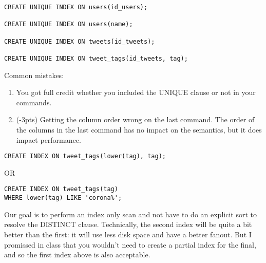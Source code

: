 \documentclass[12pt]{exam}
\theoremstyle{definition}
\begin{document}
\begin{questions}

\begin{solution}
\begin{lstlisting}
CREATE UNIQUE INDEX ON users(id_users);

CREATE UNIQUE INDEX ON users(name);

CREATE UNIQUE INDEX ON tweets(id_tweets);

CREATE UNIQUE INDEX ON tweet_tags(id_tweets, tag);
\end{lstlisting}

Common mistakes:

\begin{enumerate}
    \item You got full credit whether you included the UNIQUE clause or not in your commands.
    \item (-3pts)
        Getting the column order wrong on the last command.
        The order of the columns in the last command has no impact on the semantics, but it does impact performance.  
\end{enumerate}
\end{solution}

\newpage
{}

\begin{solution}
\begin{lstlisting}
CREATE INDEX ON tweet_tags(lower(tag), tag);
\end{lstlisting}
OR
\begin{lstlisting}
CREATE INDEX ON tweet_tags(tag)
WHERE lower(tag) LIKE 'corona%';
\end{lstlisting}

Our goal is to perform an index only scan and not have to do an explicit sort to resolve the DISTINCT clause.
Technically, the second index will be quite a bit better than the first:
it will use less disk space and have a better fanout.
But I promissed in class that you wouldn't need to create a partial index for the final, and so the first index above is also acceptable.


\end{solution}
\end{questions}
\end{document}
